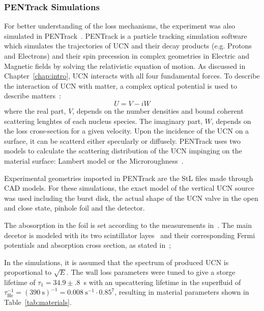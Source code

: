 \subsubsection{PENTrack Simulations}

For better understanding of the loss mechanisms, the experiment was
also simulated in PENTrack~\cite{schreyer2017pentrack}. PENTrack is a
particle tracking simulation software which simulates the trajectories
of UCN and their decay products (e.g. Protons and Electrons) and their
spin precession in complex geometries in Electric and Magnetic fields
by solving the relativistic equation of motion. As discussed in
Chapter~\ref{chap:intro}, UCN interacts with all four fundamental forces. To
describe the interaction of UCN with matter, a complex optical
potential is used to describe matters~\cite{ucnbook}:
\begin{equation}
  \label{eqn:fermipotential}
  U = V - iW
\end{equation}
where the real part, $V$, depends on the number densities and bound
coherent scattering lenghtes of each nucleus species. The imaginary
part, $W$, depends on the loss cross-section for a given velocity.
Upon the incidence of the UCN on a surface, it can be scatterd either
specularly or diffusely. PENTrack uses two models to calculate the
scattering distribution of the UCN impinging on the material surface:
Lambert model or the Microroughness~\cite{Steyerl1972}.
  
Experimental geometries imported in PENTrack are the StL files made
through CAD models. For these simulations, the exact model of the
vertical UCN source was used including the burst disk, the actual
shape of the UCN valve in the open and close state, pinhole foil and
the detector. 

The abosorption in the foil is set according to the measurements
in~\cite{atchison2009transmission}. The main decetor is modeled with
its two scintillator layes~\cite{jamieson2017characterization} and
their corresponding Fermi potentials and absorption cross section, as
stated in~\cite{Ban2016};

In the simulations, it is assumed that the spectrum of produced UCN is
proportional to $\sqrt{E}$. The wall loss parameters were tuned to
give a storge lifetime of $\tau_1 = 34.9 \pm .8$~s with an
upscattering lifetime in the superfluid of
$\tau_{\mathrm{He}}^{-1} = (390~\mathrm{s})^{-1} =
0.008~\mathrm{s}^{-1}\cdot 0.85^{7}$, resulting in material parameters
shown in Table~\ref{tab:materials}.


